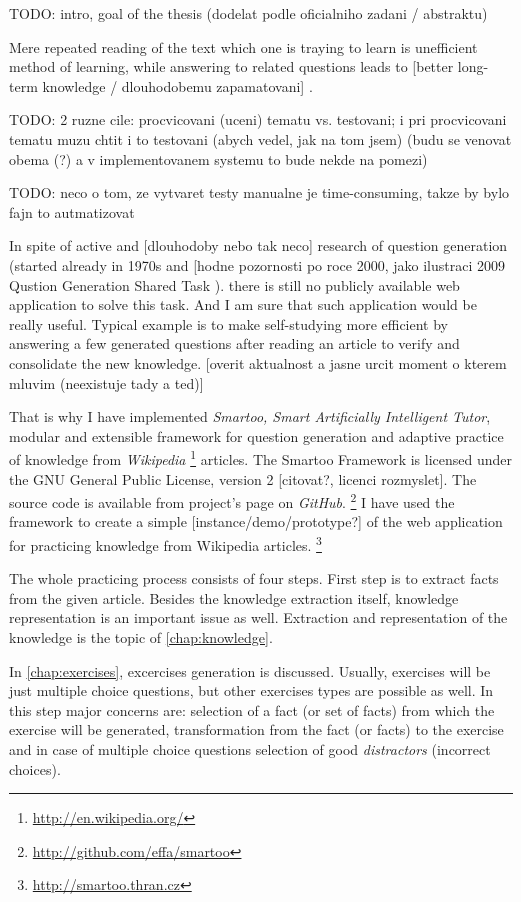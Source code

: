 \documentclass[a4paper, 12pt, twoside]{fithesis2}		%
\renewcommand{\_}{\leavevmode \kern0.07em\vbox{\hrule width0.4em}}
\newcounter{choice}
\begin{document}
TODO: intro, goal of the thesis (dodelat podle oficialniho zadani / abstraktu)

Mere repeated reading of the text which one is traying to learn is unefficient method of learning, while answering to related questions leads to [better long-term knowledge / dlouhodobemu zapamatovani] \parencite{edu-improve}.

TODO: 2 ruzne cile: procvicovani (uceni) tematu vs. testovani; i pri procvicovani tematu muzu chtit i to testovani (abych vedel, jak na tom jsem) (budu se venovat obema (?) a v implementovanem systemu to bude nekde na pomezi)

TODO: neco o tom, ze vytvaret testy manualne je time-consuming, takze by bylo fajn to autmatizovat

In spite of active and [dlouhodoby nebo tak neco] research of question generation
(started already in 1970s \parencite{questions-wolfe} and [hodne pozornosti po roce 2000, jako ilustraci 2009 Qustion Generation Shared Task \cite{shared-task2009}).
there is still no publicly available web application to solve this task.
And I am sure that such application would be really useful. Typical example is to make self-studying more efficient by answering a few generated questions after reading an article to verify and consolidate the new knowledge.
[overit aktualnost a jasne urcit moment o kterem mluvim (neexistuje tady a ted)]

That is why I have implemented \textit{Smartoo, Smart Artificially Intelligent Tutor}, modular and extensible framework for question generation and adaptive practice
of knowledge from \emph{Wikipedia}%
\footnote{\url{http://en.wikipedia.org/}}
articles.
The Smartoo Framework is licensed under the GNU General Public License, version 2 [citovat?, licenci rozmyslet].
The source code is available from project's page on \textit{GitHub}.%
\footnote{\url{http://github.com/effa/smartoo}}
I have used the framework to create a simple [instance/demo/prototype?] of the web application for practicing knowledge from Wikipedia articles.%
\footnote{\url{http://smartoo.thran.cz}}

The whole practicing process consists of four steps.
First step is to extract facts from the given article.
Besides the knowledge extraction itself, knowledge representation is an important issue as well.
Extraction and representation of the knowledge is the topic of \autoref{chap:knowledge}.

In \autoref{chap:exercises}, excercises generation is discussed.
Usually, exercises will be just multiple choice questions, but other exercises types are possible as well.
In this step major concerns are: selection of a fact (or set of facts) from which the exercise will be generated, transformation from the fact (or facts) to the exercise and in case of multiple choice questions selection of good \textit{distractors} (incorrect choices).
\end{document}
